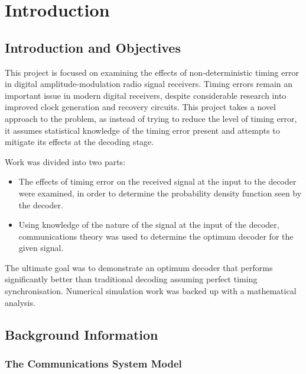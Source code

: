 
\part{Introduction}

\chapter{Introduction and Objectives}

This project is focused on examining the effects of non-deterministic timing error in digital amplitude-modulation radio signal receivers. Timing errors remain an important issue in modern digital receivers, despite considerable research into improved clock generation and recovery circuits. This project takes a novel approach to the problem, as instead of trying to reduce the level of timing error, it assumes statistical knowledge of the timing error present and attempts to mitigate its effects at the decoding stage.

Work was divided into two parts:

\begin{itemize}
\item
The effects of timing error on the received signal at the input to the decoder were examined, in order to determine the probability density function seen by the decoder.
\item
Using knowledge of the nature of the signal at the input of the decoder, communications theory was used to determine the optimum decoder for the given signal.
\end{itemize}

The ultimate goal was to demonstrate an optimum decoder that performs significantly better than traditional decoding assuming perfect timing synchronisation. Numerical simulation work was backed up with a mathematical analysis.

\chapter{Background Information}

\section{The Communications System Model}

